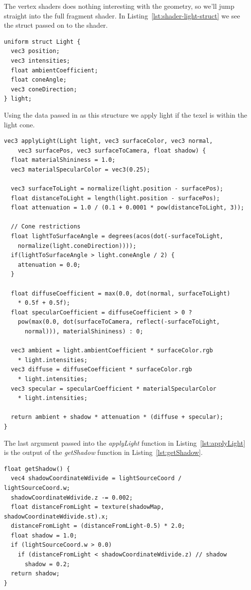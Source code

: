 \documentclass[a4paper,12pt]{article}
\begin{document}
The vertex shaders does nothing interesting with the geometry, so we'll jump straight into the full fragment shader. In Listing~\ref{lst:shader-light-struct} we see the struct passed on to the shader.

\begin{lstlisting}[label=lst:shader-light-struct,caption= The light struct received in the shader.]
uniform struct Light {
  vec3 position;
  vec3 intensities;
  float ambientCoefficient;
  float coneAngle;
  vec3 coneDirection;
} light;
\end{lstlisting}

Using the data passed in as this structure we apply light if the texel is within the light cone.

\begin{lstlisting}[label=lst:applyLight,caption= Shader function for applying lighting]
vec3 applyLight(Light light, vec3 surfaceColor, vec3 normal,
    vec3 surfacePos, vec3 surfaceToCamera, float shadow) {
  float materialShininess = 1.0;
  vec3 materialSpecularColor = vec3(0.25);

  vec3 surfaceToLight = normalize(light.position - surfacePos);
  float distanceToLight = length(light.position - surfacePos);
  float attenuation = 1.0 / (0.1 + 0.0001 * pow(distanceToLight, 3));

  // Cone restrictions
  float lightToSurfaceAngle = degrees(acos(dot(-surfaceToLight,
    normalize(light.coneDirection))));
  if(lightToSurfaceAngle > light.coneAngle / 2) {
    attenuation = 0.0;
  }

  float diffuseCoefficient = max(0.0, dot(normal, surfaceToLight)
    * 0.5f + 0.5f);
  float specularCoefficient = diffuseCoefficient > 0 ?
    pow(max(0.0, dot(surfaceToCamera, reflect(-surfaceToLight,
      normal))), materialShininess) : 0;

  vec3 ambient = light.ambientCoefficient * surfaceColor.rgb
    * light.intensities;
  vec3 diffuse = diffuseCoefficient * surfaceColor.rgb
    * light.intensities;
  vec3 specular = specularCoefficient * materialSpecularColor
    * light.intensities;

  return ambient + shadow * attenuation * (diffuse + specular);
}
\end{lstlisting}

The last argument passed into the \emph{applyLight} function in Listing~\ref{lst:applyLight} is the output of the \emph{getShadow} function in Listing~\ref{lst:getShadow}.

\begin{lstlisting}[label=lst:getShadow,caption= The shader function figuring out whether the texel is in the shade.]
float getShadow() {
  vec4 shadowCoordinateWdivide = lightSourceCoord / lightSourceCoord.w;
  shadowCoordinateWdivide.z -= 0.002;
  float distanceFromLight = texture(shadowMap, shadowCoordinateWdivide.st).x;
  distanceFromLight = (distanceFromLight-0.5) * 2.0;
  float shadow = 1.0;
  if (lightSourceCoord.w > 0.0)
    if (distanceFromLight < shadowCoordinateWdivide.z) // shadow
      shadow = 0.2;
  return shadow;
}
\end{lstlisting}
\end{document}
